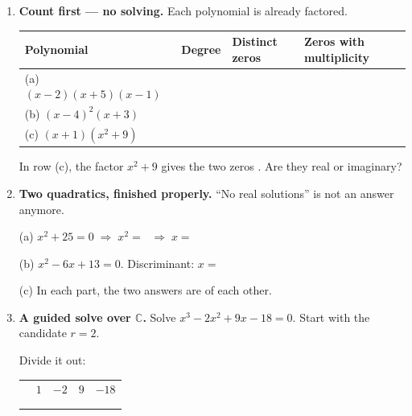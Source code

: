 \documentclass[10pt]{article}
\begin{document}
\begin{tcolorbox}[colback=white, colframe=black!40, title=\textbf{Tier R --- Remediate},
    fonttitle=\bfseries, arc=1.5mm, left=3mm, right=3mm, top=2mm, bottom=2mm, breakable]
\begin{enumerate}[leftmargin=1.7em, itemsep=9pt]
  \item \textbf{Count first --- no solving.} Each polynomial is already factored.

    \vspace{3pt}
    \renewcommand{\arraystretch}{1.5}
    \begin{tabularx}{\linewidth}{|X|C{1.8cm}|C{3.6cm}|C{3.4cm}|}
    \hline
    \textbf{Polynomial} & \textbf{Degree} & \textbf{Distinct zeros} & \textbf{Zeros with multiplicity} \\ \hline
    (a) $(x-2)(x+5)(x-1)$ &  &  &  \\ \hline
    (b) $(x-4)^2(x+3)$    &  &     &  \\ \hline
    (c) $(x+1)(x^2+9)$    &  &  &  \\ \hline
    \end{tabularx}

    \vspace{3pt}
    In row (c), the factor $x^2+9$ gives the two zeros . Are they real or imaginary?

  \item \textbf{Two quadratics, finished properly.} ``No real solutions'' is not an answer anymore.

    \vspace{2pt}
    (a) $x^2 + 25 = 0 \;\Rightarrow\; x^2 = $  $\;\Rightarrow\; x = $ 

    \vspace{2pt}
    (b) $x^2 - 6x + 13 = 0$. \quad Discriminant:  \quad $x = $

    \vspace{2pt}
    (c) In each part, the two answers are  of each other.

  \item \textbf{A guided solve over $\mathbb{C}$.} Solve $x^3 - 2x^2 + 9x - 18 = 0$. Start with the
    candidate $r = 2$.

    \vspace{2pt}
    Divide it out:
    \begin{center}
    \renewcommand{\arraystretch}{1.6}
    \begin{tabular}{r|C{1.4cm}C{1.4cm}C{1.4cm}C{1.4cm}}
     & $1$ & $-2$ & $9$ & $-18$ \\
        &     &  &  &  \\ 
        &  &  &  &  \\
    \end{tabular}
    \end{center}


\end{enumerate}
\end{tcolorbox}
\end{document}
